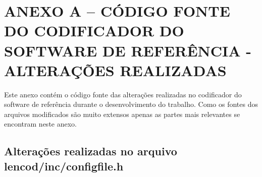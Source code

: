 \chapter{ANEXO A -- CÓDIGO FONTE DO CODIFICADOR DO SOFTWARE DE REFERÊNCIA - ALTERAÇÕES REALIZADAS}

Este anexo contém o código fonte das alterações realizadas no codificador do software de referência durante o desenvolvimento do trabalho. Como os fontes dos arquivos modificados são muito extensos apenas as partes mais relevantes se encontram neste anexo.

\section{Alterações realizadas no arquivo lencod/inc/configfile.h}


